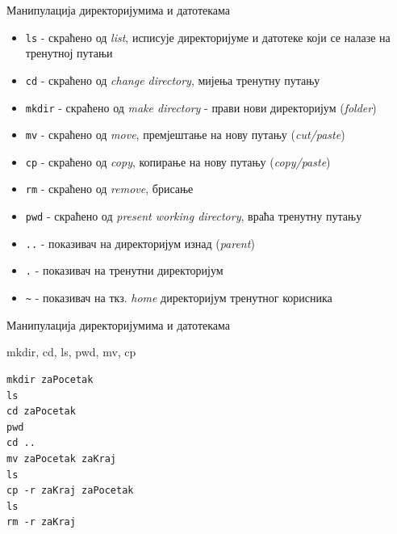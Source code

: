 \documentclass{beamer}
\begin{document}
\begin{frame}[fragile]{Манипулација директоријумима и датотекама}

\begin{itemize}
    \item \texttt{ls} - скраћено од \textit{list}, исписује директоријуме и датотеке који се налазе на тренутној путањи
    \item \texttt{cd} - скраћено од \textit{change directory}, мијења тренутну путању
    \item \texttt{mkdir} - скраћено од \textit{make directory} - прави нови директоријум (\textit{folder})
    \item \texttt{mv} - скраћено од \textit{move}, премјештање на нову путању (\textit{cut/paste})
    \item \texttt{cp} - скраћено од \textit{copy}, копирање на нову путању (\textit{copy/paste})
    \item \texttt{rm} - скраћено од \textit{remove}, брисање
    \item \texttt{pwd} - скраћено од \textit{present working directory}, враћа тренутну путању
    \item \texttt{..} - показивач на директоријум изнад (\textit{parent})
    \item \texttt{.} - показивач на тренутни директоријум
    \item \texttt{\~} - показивач на ткз. \textit{home} директоријум тренутног корисника
\end{itemize}
\end{frame}

\begin{frame}[fragile]{Манипулација директоријумима и датотекама}
\begin{block}{mkdir, cd, ls, pwd, mv, cp}
\begin{lstlisting}
mkdir zaPocetak
ls
cd zaPocetak
pwd
cd ..
mv zaPocetak zaKraj
ls
cp -r zaKraj zaPocetak
ls
rm -r zaKraj
\end{lstlisting}
\end{block}
\end{frame}
\end{document}
